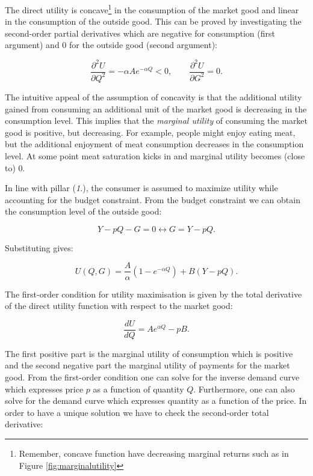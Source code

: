 \documentclass[
]{book}
\begin{document}
The direct utility is concave\footnote{Remember, concave function have decreasing marginal returns such as in Figure \ref{fig:marginalutility}} in the consumption of the market good and linear in the consumption of the outside good. This can be proved by investigating the second-order partial derivatives which are negative for consumption (first argument) and 0 for the outside good (second argument):

\begin{equation}
\frac{\partial^2 U}{\partial Q^2} = - \alpha Ae^{-\alpha Q} < 0, \qquad \frac{\partial^2 U}{\partial G^2} = 0.
\end{equation}

The intuitive appeal of the assumption of concavity is that the additional utility gained from consuming an additional unit of the market good is decreasing in the consumption level. This implies that the \emph{marginal utility} of consuming the market good is positive, but decreasing. For example, people might enjoy eating meat, but the additional enjoyment of meat consumption decreases in the consumption level. At some point meat saturation kicks in and marginal utility becomes (close to) 0.

In line with pillar (\emph{1.}), the consumer is assumed to maximize utility while accounting for the budget constraint. From the budget constraint we can obtain the consumption level of the outside good:

\begin{equation}
Y - pQ - G = 0 \longleftrightarrow G= Y - pQ.
\end{equation}

Substituting gives:

\begin{equation}
U(Q,G)=\frac{A}{\alpha}(1-e^{-\alpha Q})+B(Y - p Q).
\end{equation}

The first-order condition for utility maximisation is given by the total derivative of the direct utility function with respect to the market good:

\begin{equation}
\frac{dU}{dQ} = Ae^{\alpha Q} - pB.
\label{eq:foc}
\end{equation}

The first positive part is the marginal utility of consumption which is positive and the second negative part the marginal utility of payments for the market good. From the first-order condition one can solve for the inverse demand curve which expresses price \(p\) as a function of quantity \(Q\). Furthermore, one can also solve for the demand curve which expresses quantity as a function of the price. In order to have a unique solution we have to check the second-order total derivative:
\end{document}
